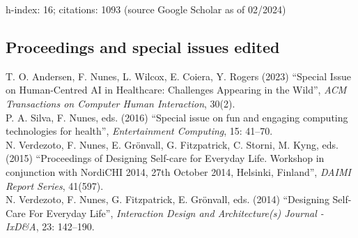\documentclass[11pt, a4paper]{article} %
\newcommand{\years}[1]{\marginnote{\scriptsize #1}} %
\begin{document}
h-index: 16; citations: 1093 (source Google Scholar as of 02/2024)

\subsection*{Proceedings and special issues edited}

\years{2023}T. O. Andersen, F. Nunes, L. Wilcox, E. Coiera, Y. Rogers (2023) ``Special Issue on Human-Centred AI in Healthcare: Challenges Appearing in the Wild'', \emph{ACM Transactions on Computer Human Interaction}, 30(2).\\
\years{2016}P. A. Silva, F. Nunes, eds. (2016) ``Special issue on fun and engaging computing technologies for health'', \emph{Entertainment Computing}, 15: 41--70.\\
\years{2015}N. Verdezoto, F. Nunes, E. Grönvall, G. Fitzpatrick, C. Storni, M. Kyng, eds. (2015) ``Proceedings of Designing Self-care for Everyday Life. Workshop in conjunction with NordiCHI 2014, 27th October 2014, Helsinki, Finland'', \emph{DAIMI Report Series}, 41(597).\\
\years{2014}N. Verdezoto, F. Nunes, G. Fitzpatrick, E. Grönvall, eds. (2014) ``Designing Self-Care For Everyday Life'', \emph{Interaction Design and Architecture(s) Journal - IxD\&A}, 23: 142--190.
\end{document}
